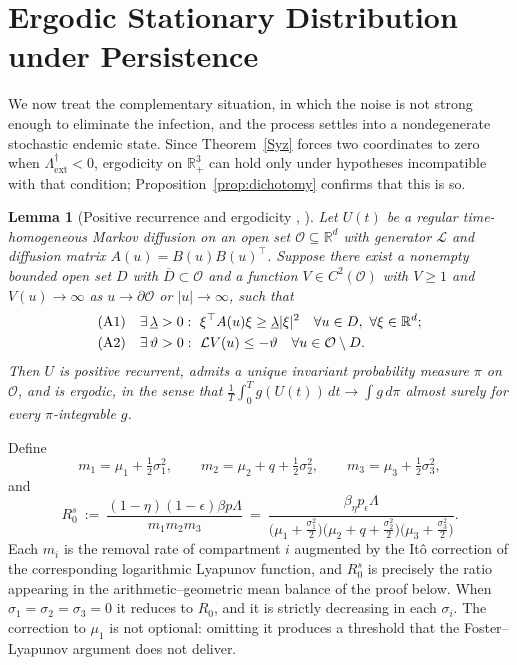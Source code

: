 \documentclass{article}
\newtheorem{lemma}{Lemma}[section]
\newcommand{\betaeta}{\beta_\eta}
\newcommand{\peps}{p_\epsilon}
\newcommand{\Rz}{R_0}
\newcommand{\Rs}{R_0^{s}}
\newcommand{\Lsharp}{\Lambda_{\mathrm{ext}}^{\dagger}}
\begin{document}
\section{Ergodic Stationary Distribution under Persistence}\label{sec:ergodic}

We now treat the complementary situation, in which the noise is not strong enough to eliminate the infection, and the process settles into a nondegenerate stochastic endemic state. Since Theorem~\ref{Syz} forces two coordinates to zero when $\Lsharp<0$, ergodicity on $\mathbb{R}^3_+$ can hold only under hypotheses incompatible with that condition; Proposition~\ref{prop:dichotomy} confirms that this is so.

\begin{lemma}[Positive recurrence and ergodicity {\citep[Thm.~4.1]{Ref29}}, {\citep[Lem.~2.3]{Ref33}}]\label{lem:MT}
Let $U(t)$ be a regular time-homogeneous Markov diffusion on an open set $\mathcal{O}\subseteq\mathbb{R}^d$ with generator $\mathcal{L}$ and diffusion matrix $A(u)=B(u)B(u)^\top$. Suppose there exist a nonempty bounded open set $D$ with $\overline{D}\subset\mathcal{O}$ and a function $V\in C^2(\mathcal{O})$ with $V\ge1$ and $V(u)\to\infty$ as $u\to\partial\mathcal{O}$ or $|u|\to\infty$, such that
\begin{align}
&\text{\emph{(A1)}}\quad \exists\,\underline{\lambda}>0:\ \xi^{\top}A(u)\xi\ge \underline{\lambda}|\xi|^2\quad \forall u\in D,\ \forall\xi\in\mathbb{R}^d; \label{A1}\\
&\text{\emph{(A2)}}\quad \exists\,\vartheta>0:\ \mathcal{L}V(u)\le -\vartheta \quad \forall u\in \mathcal{O}\setminus D. \label{A2}
\end{align}
Then $U$ is positive recurrent, admits a unique invariant probability measure $\pi$ on $\mathcal{O}$, and is ergodic, in the sense that $\frac1T\int_0^Tg(U(t))\,dt\to\int g\,d\pi$ almost surely for every $\pi$-integrable $g$.
\end{lemma}

Define
\begin{equation}\label{eq:mi}
m_1=\mu_1+\tfrac12\sigma_1^2,\qquad m_2=\mu_2+q+\tfrac12\sigma_2^2,\qquad m_3=\mu_3+\tfrac12\sigma_3^2,
\end{equation}
and
\begin{equation}\label{eq:Rs}
\Rs\ :=\ \frac{(1-\eta)(1-\epsilon)\beta p\Lambda}{m_1m_2m_3}\ =\ \frac{\betaeta\peps\Lambda}{\big(\mu_1+\frac{\sigma_1^2}{2}\big)\big(\mu_2+q+\frac{\sigma_2^2}{2}\big)\big(\mu_3+\frac{\sigma_3^2}{2}\big)} .
\end{equation}
Each $m_i$ is the removal rate of compartment $i$ augmented by the It\^o correction of the corresponding logarithmic Lyapunov function, and $\Rs$ is precisely the ratio appearing in the arithmetic--geometric mean balance of the proof below. When $\sigma_1=\sigma_2=\sigma_3=0$ it reduces to $\Rz$, and it is strictly decreasing in each $\sigma_i$. The correction to $\mu_1$ is not optional: omitting it produces a threshold that the Foster--Lyapunov argument does not deliver.
\end{document}
